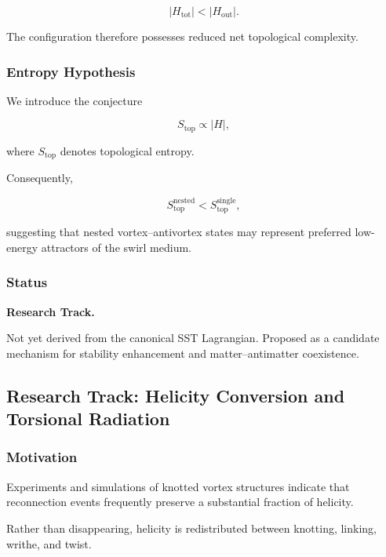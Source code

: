         \[
            |H_{\mathrm{tot}}|
            <
            |H_{\mathrm{out}}|.
        \]
        
        The configuration therefore possesses reduced net topological complexity.
    
    \subsubsection{Entropy Hypothesis}
        
        We introduce the conjecture
        
        \[
            S_{\mathrm{top}}
            \propto
            |H|,
        \]
        
        where $S_{\mathrm{top}}$ denotes topological entropy.
        
        Consequently,
        
        \[
            S_{\mathrm{top}}^{\mathrm{nested}}
            <
            S_{\mathrm{top}}^{\mathrm{single}},
        \]
        
        suggesting that nested vortex--antivortex states may represent preferred
        low-energy attractors of the swirl medium.
    
    \subsubsection{Status}
        
        \textbf{Research Track.}
        
        Not yet derived from the canonical SST Lagrangian.
        Proposed as a candidate mechanism for stability enhancement and
        matter--antimatter coexistence.
    
    
\subsection{Research Track: Helicity Conversion and Torsional Radiation}
    
    \subsubsection{Motivation}
        
        Experiments and simulations of knotted vortex structures indicate that
        reconnection events frequently preserve a substantial fraction of helicity.
        
        Rather than disappearing, helicity is redistributed between knotting,
        linking, writhe, and twist.
    
